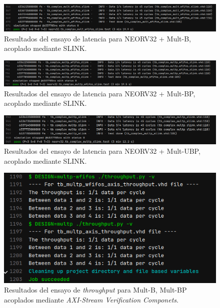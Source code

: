 \begin{figure}[H]
    \centering
    \includegraphics[width=14cm]{Figuras/result/lat2.png}
    \caption{Resultados del ensayo de latencia para NEORV32 + Mult-B, acoplado mediante SLINK.}
    \label{fig:lat2}
\end{figure}

\begin{figure}[H]
    \centering
    \includegraphics[width=14cm]{Figuras/result/lat3.png}
    \caption{Resultados del ensayo de latencia para NEORV32 + Mult-BP, acoplado mediante SLINK.}
    \label{fig:lat3}
\end{figure}

\begin{figure}[H]
    \centering
    \includegraphics[width=14cm]{Figuras/result/lat4.png}
    \caption{Resultados del ensayo de latencia para NEORV32 + Mult-UBP, acoplado mediante SLINK.}
    \label{fig:lat4}
\end{figure}

\begin{figure}[H]
    \centering
    \includegraphics[width=14cm]{Figuras/result/thr1.png}
    \caption{Resultados del ensayo de \textit{throughput} para Mult-B, Mult-BP acoplados mediante \textit{AXI-Stream Verification Componets}.}
    \label{fig:thr1}
\end{figure}

